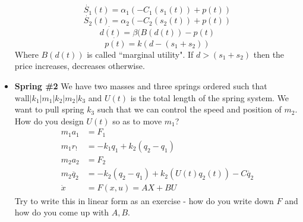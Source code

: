 \documentclass[12pt]{article}
\theoremstyle{definition}
\begin{document}
\begin{itemize}
    $$ \dot{S_1}(t) = \alpha_1 \left( -C_1(s_1(t)) + p(t)\right)$$
    $$ \dot{S_2}(t) = \alpha_2 \left( -C_2(s_2(t)) + p(t)\right)$$
    $$ \dot{d(t)} = \beta(B(d(t)) - p(t)$$
    $$ \dot{p(t)} = k(d - (s_1 + s_2))$$
    Where $B(d(t))$ is called ``marginal utility". If $d > (s_1 + s_2)$ then the price increases, decreases otherwise.
    \item \textbf{Spring \#2} We have two masses and three springs ordered such that $\text{wall} | k_1 | m_1 | k_2 | m_2 | k_3$ and $U(t)$ is the total length of the spring system. We want to pull spring $k_3$ such that we can control the speed and position of $m_2$. How do you design $U(t)$ so as to move $m_1$?
    \begin{align*}
    m_1a_1 &= F_1 \\
    m_1r_! &= -k_1q_1 + k_2(q_2 - q_1) \\
    m_2a_2 &= F_2 \\
    m_2\ddot{q_2} &= -k_2(q_2 - q_1) + k_2(U(t)q_2(t)) - C\dot{q_2} \\
    \dot{x} &= F(x, u) = AX + BU
    \end{align*}
    Try to write this in linear form as an exercise - how do you write down $F$ and how do you come up with $A, B$.
\end{itemize}
\end{document}
